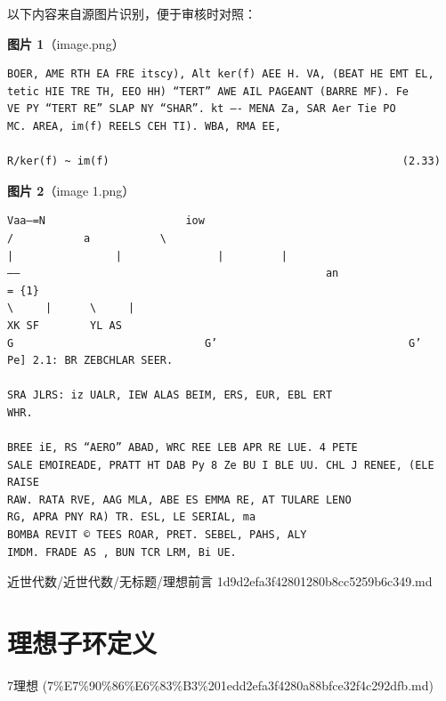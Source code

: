 \begin{note}
以下内容来自源图片识别，便于审核时对照：

\textbf{图片 1}（image.png）
\begin{Verbatim}[fontsize=\small]
BOER, AME RTH EA FRE itscy), Alt ker(f) AEE H. VA, (BEAT HE EMT EL,
tetic HIE TRE TH, EEO HH) “TERT” AWE AIL PAGEANT (BARRE MF). Fe
VE PY “TERT RE” SLAP NY “SHAR”. kt —- MENA Za, SAR Aer Tie PO
MC. AREA, im(f) REELS CEH TI). WBA, RMA EE,

R/ker(f) ~ im(f)                                              (2.33)
\end{Verbatim}

\textbf{图片 2}（image 1.png）
\begin{Verbatim}[fontsize=\small]
Vaa—=N                      iow
/           a           \
|                |               |         |
——                                                an                   = {1}
\     |      \     |
XK SF        YL AS
G                              G’                              G’
Pe] 2.1: BR ZEBCHLAR SEER.

SRA JLRS: iz UALR, IEW ALAS BEIM, ERS, EUR, EBL ERT
WHR.

BREE iE, RS “AERO” ABAD, WRC REE LEB APR RE LUE. 4 PETE
SALE EMOIREADE, PRATT HT DAB Py 8 Ze BU I BLE UU. CHL J RENEE, (ELE RAISE
RAW. RATA RVE, AAG MLA, ABE ES EMMA RE, AT TULARE LENO
RG, APRA PNY RA) TR. ESL, LE SERIAL, ma
BOMBA REVIT © TEES ROAR, PRET. SEBEL, PAHS, ALY
IMDM. FRADE AS , BUN TCR LRM, Bi UE.
\end{Verbatim}

\end{note}

\begin{note}[来源路径]

近世代数/近世代数/无标题/理想前言 1d9d2efa3f42801280b8cc5259b6c349.md

\end{note}

\section*{理想子环定义}

\begin{note}[来源上级主题]

7理想 (7\%E7\%90\%86\%E6\%83\%B3\%201edd2efa3f4280a88bfce32f4c292dfb.md)

\end{note}

